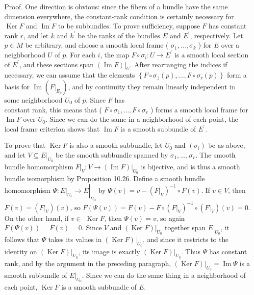 \documentclass[10pt, letterpaper]{article}
\begin{document}
Proof. One direction is obvious: since the fibers of a bundle have the same dimension everywhere, the constant-rank condition is certainly necessary for $\operatorname{Ker} F$ and $\operatorname{Im} F$ to be subbundles. To prove sufficiency, suppose $F$ has constant rank $r$, and let $k$ and $k^{\prime}$ be the ranks of the bundles $E$ and $E^{\prime}$, respectively. Let $p \in M$ be arbitrary, and choose a smooth local frame ( $\sigma_{1}, \ldots, \sigma_{k}$ ) for $E$ over a neighborhood $U$ of $p$. For each $i$, the map $F \circ \sigma_{i}: U \rightarrow E^{\prime}$ is a smooth local section of $E^{\prime}$, and these sections span $\left.(\operatorname{Im} F)\right|_{U}$. After rearranging the indices if necessary, we can assume that the elements $\left\{F \circ \sigma_{1}(p), \ldots, F \circ \sigma_{r}(p)\right\}$ form a basis for $\operatorname{Im}\left(\left.F\right|_{E_{p}}\right)$, and by continuity they remain linearly independent in some neighborhood $U_{0}$ of $p$. Since $F$ has\\
constant rank, this means that ( $F \circ \sigma_{1}, \ldots, F \circ \sigma_{r}$ ) forms a smooth local frame for $\operatorname{Im} F$ over $U_{0}$. Since we can do the same in a neighborhood of each point, the local frame criterion shows that $\operatorname{Im} F$ is a smooth subbundle of $E^{\prime}$.

To prove that $\operatorname{Ker} F$ is also a smooth subbundle, let $U_{0}$ and $\left(\sigma_{i}\right)$ be as above, and let $\left.V \subseteq E\right|_{U_{0}}$ be the smooth subbundle spanned by $\sigma_{1}, \ldots, \sigma_{r}$. The smooth bundle homomorphism $\left.F\right|_{V}:\left.V \rightarrow(\operatorname{Im} F)\right|_{U_{0}}$ is bijective, and is thus a smooth bundle isomorphism by Proposition 10.26. Define a smooth bundle homomorphism $\Psi:\left.\left.E\right|_{U_{0}} \rightarrow E\right|_{U_{0}}$ by $\Psi(v)=v-\left(\left.F\right|_{V}\right)^{-1} \circ F(v)$. If $v \in V$, then $F(v)=\left(\left.F\right|_{V}\right)(v)$, so $F(\Psi(v))=F(v)-F \circ\left(\left.F\right|_{V}\right)^{-1} \circ\left(\left.F\right|_{V}\right)(v)=0$. On the other hand, if $v \in$ $\operatorname{Ker} F$, then $\Psi(v)=v$, so again $F(\Psi(v))=F(v)=0$. Since $V$ and $\left.(\operatorname{Ker} F)\right|_{U_{0}}$ together span $\left.E\right|_{U_{0}}$, it follows that $\Psi$ takes its values in $\left.(\operatorname{Ker} F)\right|_{U_{0}}$, and since it restricts to the identity on $\left.(\operatorname{Ker} F)\right|_{U_{0}}$, its image is exactly $\left.(\operatorname{Ker} F)\right|_{U_{0}}$. Thus $\Psi$ has constant rank, and by the argument in the preceding paragraph, $\left.(\operatorname{Ker} F)\right|_{U_{0}}=\operatorname{Im} \Psi$ is a smooth subbundle of $\left.E\right|_{U_{0}}$. Since we can do the same thing in a neighborhood of each point, $\operatorname{Ker} F$ is a smooth subbundle of $E$.
\end{document}

